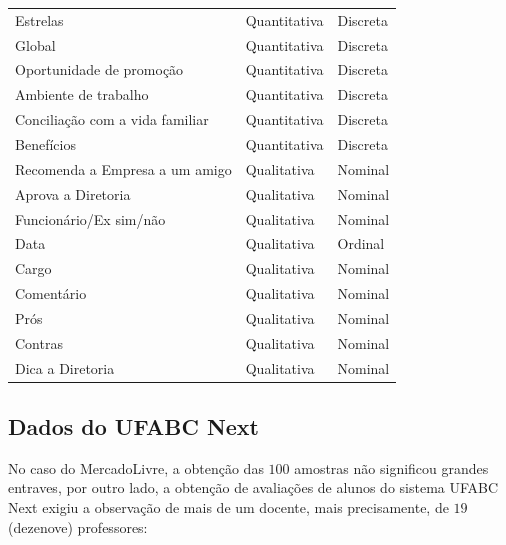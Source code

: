 \begin{center}
\begin{longtable}{|l|l|l|}
    Estrelas & Quantitativa & Discreta \\
    Global & Quantitativa & Discreta \\
    Oportunidade de promoção & Quantitativa & Discreta \\
    Ambiente de trabalho & Quantitativa & Discreta \\
    Conciliação com a vida familiar & Quantitativa & Discreta \\
    Benefícios & Quantitativa & Discreta \\
    Recomenda a Empresa a um amigo & Qualitativa & Nominal \\
    Aprova a Diretoria & Qualitativa & Nominal \\
    Funcionário/Ex sim/não & Qualitativa & Nominal \\
    Data & Qualitativa & Ordinal \\
    Cargo & Qualitativa & Nominal \\
    Comentário & Qualitativa & Nominal \\
    Prós & Qualitativa & Nominal \\
    Contras & Qualitativa & Nominal \\
    Dica a Diretoria & Qualitativa & Nominal \\
    \end{longtable}
    \end{center}
    
    \subsection{Dados do UFABC Next}
    
    No caso do MercadoLivre, a obtenção das $100$ amostras não significou grandes entraves, por outro lado, a obtenção de avaliações de alunos do sistema UFABC Next exigiu a observação de mais de um docente, mais precisamente, de $19$ (dezenove) professores:
    
